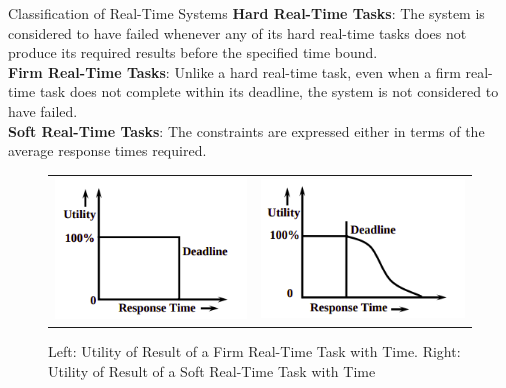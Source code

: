 \documentclass{beamer}
\begin{document}
\begin{frame}{Classification of Real-Time Systems}
\textbf{Hard Real-Time Tasks}: The system is considered to have failed whenever any of its hard real-time tasks does not produce its required results before the specified time bound.\\
\textbf{Firm Real-Time Tasks}: Unlike a hard real-time task, even when a firm real-time task does not complete within its deadline, the system is not considered to have failed. \\
\textbf{Soft Real-Time Tasks}: The constraints are expressed either in terms of the average response times required. 
\begin{figure}[h]
\begin{tabular}{ll}
\includegraphics[scale=0.45]{images/firm-rts.png}
&
\includegraphics[scale=0.45]{images/soft-rts.png}
\end{tabular}
\caption{Left:  Utility of Result of a Firm Real-Time Task with Time. 
Right:  Utility of Result of a Soft Real-Time Task with Time}
\end{figure}
    
\end{frame}
\end{document}
